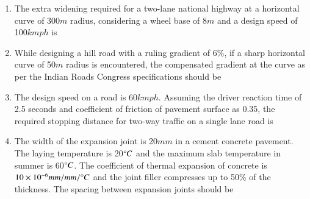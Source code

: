 \documentclass[journal,12pt,onecolumn]{IEEEtran}
\theoremstyle{remark}
\begin{document}
\begin{enumerate}
\begin{enumerate}
\end{enumerate}
\item The extra widening required for a two-lane national highway at a horizontal curve of 300$m$ radius, considering a wheel base of 8$m$ and a design speed of 100$kmph$ is
\begin{enumerate}
\end{enumerate}
\item While designing a hill road with a ruling gradient of 6\%, if a sharp horizontal curve of 50$m$ radius is encountered, the compensated gradient at the curve as per the Indian Roads Congress specifications should be
\begin{enumerate}
\end{enumerate}
\item The design speed on a road is 60$kmph$. Assuming the driver reaction time of 2.5 seconds and coefficient of friction of pavement surface as 0.35, the required stopping distance for two-way traffic on a single lane road is
\begin{enumerate}
\end{enumerate}
\item The width of the expansion joint is 20$mm$ in a cement concrete pavement. The laying temperature is 20$\degree C$ and the maximum slab temperature in summer is 60$\degree C$. The coefficient of thermal expansion of concrete is $10\times10^{-6} mm/mm/\degree C$ and the joint filler compresses up to 50\% of the thickness. The spacing between expansion joints should be 

\end{enumerate}
\end{document}

